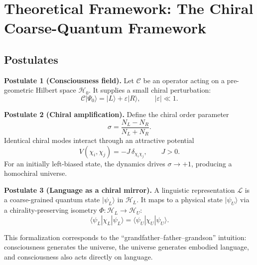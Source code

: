 \documentclass[10pt,a4paper]{article}
\begin{document}
\section*{Theoretical Framework: The Chiral Coarse-Quantum Framework}
\subsection*{Postulates}

\noindent\textbf{Postulate 1 (Consciousness field).} Let $\mathcal{C}$ be an operator acting on a pre-geometric Hilbert space $\mathcal{H}_0$. It supplies a small chiral perturbation:
\begin{equation}
\mathcal{C}|\Psi_0\rangle = |L\rangle + \varepsilon |R\rangle,\qquad |\varepsilon|\ll 1.
\label{eq:perturbation}
\end{equation}

\noindent\textbf{Postulate 2 (Chiral amplification).} Define the chiral order parameter
\begin{equation}
\sigma = \frac{N_L - N_R}{N_L + N_R}.
\label{eq:orderparam}
\end{equation}
Identical chiral modes interact through an attractive potential
\begin{equation}
V(\chi_i,\chi_j) = -J\,\delta_{\chi_i\chi_j},\qquad J>0.
\label{eq:potential}
\end{equation}
For an initially left-biased state, the dynamics drives $\sigma\to +1$, producing a homochiral universe.

\noindent\textbf{Postulate 3 (Language as a chiral mirror).} A linguistic representation $\mathcal{L}$ is a coarse-grained quantum state $|\psi_L\rangle$ in $\mathcal{H}_L$. It maps to a physical state $|\psi_U\rangle$ via a chirality-preserving isometry $\Phi:\mathcal{H}_L\to\mathcal{H}_U$:
\begin{equation}
\langle\psi_L|\chi_L|\psi_L\rangle = \langle\psi_U|\chi_U|\psi_U\rangle.
\label{eq:language}
\end{equation}

This formalization corresponds to the ``grandfather--father--grandson'' intuition: consciousness generates the universe, the universe generates embodied language, and consciousness also acts directly on language.
\end{document}
